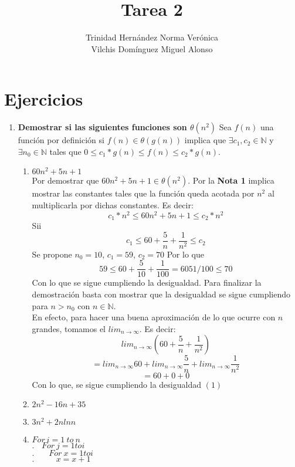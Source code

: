 \documentclass[11 pt, a4paper]{article}
\author{Trinidad Hern\'andez Norma Ver\'onica \\
        Vilchis Dom\'inguez Miguel Alonso}
\title{Tarea 2}
\date{}
\theoremstyle{definition}
\begin{document}
\maketitle

\section{Ejercicios}

\begin{enumerate}
 \item \textbf{Demostrar si las siguientes funciones son $\theta(n^2)$}
 \no Sea $f(n)$ una función por definición si $f(n) \in \theta(g(n))$ 
 implica que $ \exists c_1, c_2 \in \mathbb{N} $ y $\exists n_0 \in \mathbb{N}$ 
 tales que $0 \leq c_1*g(n) \leq f(n) \leq c_2*g(n)$.
 \begin{enumerate}
  \item $60n^2 + 5n +1$\\
  Por demostrar que $60n^2 + 5n +1 \in \theta(n^2)$. Por la \textbf{Nota 1}
  implica mostrar las constantes tales que la función queda acotada por 
  $n^2$ al multiplicarla por dichas constantes. Es decir:\\
  \begin{equation} 
   c_1* n^2 \leq 60n^2 + 5n +1 \leq c_2 * n^2 
   \end{equation}
  Sii
  \[ c_1 \leq 60 + \frac{5}{n} + \frac{1}{n^2} \leq c_2 \]
  Se propone $n_0 = 10$, $c_1 = 59$, $c_2 = 70$  Por lo que
  \[ 59 \leq 60 + \frac{5}{10} + \frac{1}{100} = 6051/100 \leq 70  \]
  Con lo que se sigue cumpliendo la desigualdad. Para finalizar la demostración 
  basta con mostrar que la desigualdad se sigue cumpliendo para
  $n > n_0$ con $n \in \mathbb{N}$.\\ 
  En efecto, para hacer una buena aproximación de lo que ocurre con 
  $n$ grandes, tomamos el $lim_{n \rightarrow \infty}$. Es decir:
  \[ lim_{n \rightarrow \infty} (60 + \frac{5}{n} + \frac{1}{n^2} )\]
   \[  = lim_{n \rightarrow \infty} 60 + lim_{n \rightarrow \infty} \frac{5}{n} + lim_{n \rightarrow \infty} \frac{1}{n^2} \]
  \[  = 60 + 0+0 \]
  Con lo que, se sigue cumpliendo la desigualdad $(1)$
  
  \item $2n^2 - 16 n + 35$
  \item $3 n^2 + 2 n ln n$
  \item $For\ i = 1 \ to \ n$\\
        $.\ \ \ \ For\ j = 1 to i$\\
        $.\ \ \ \ \ \ \ \ For\ x = 1 to i$ \\
        $.\ \ \ \ \ \ \ \ \ \ \ \ x= x +1$ \\                     

 \end{enumerate}

\end{enumerate}
\end{document}
